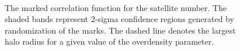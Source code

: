\documentclass[usenatbib,usegraphicx,letterpaper]{mn2e}
\begin{document}
\begin{figure}
	\centering
	\\
	\caption{The marked correlation function for the satellite number. The shaded bands represent 2-sigma confidence regions generated by randomization of the marks. The dashed line denotes the largest halo radius for a given value of the overdensity parameter.}
\end{figure}
\end{document}
